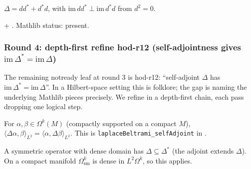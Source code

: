 \begin{lemma}[Pass hod.14: $\mathrm{im}\,\Delta = \mathrm{im}\,d\oplus\mathrm{im}\,d^{*}$]
\label{lem:hod-r14}
$\Delta = dd^{*} + d^{*}d$, with $\mathrm{im}\,dd^{*} \perp \mathrm{im}\,d^{*}d$ from $d^{2}=0$.
\leanok
\end{lemma}

\begin{lemma}
\label{lem:hod-r15}
 + .  Mathlib status: present.
\leanok\mathlibok
\end{lemma}

\subsubsection*{Round 4: depth-first refine hod-r12 (self-adjointness gives $\mathrm{im}\,\Delta^{*} = \mathrm{im}\,\Delta$)}

The remaining \textsf{notready} leaf at round 3 is hod-r12: ``self-adjoint $\Delta$ has $\mathrm{im}\,\Delta^{*} = \mathrm{im}\,\Delta$''.  In a Hilbert-space setting this is folklore; the gap is naming the underlying Mathlib pieces precisely.  We refine in a depth-first chain, each pass dropping one logical step.

\begin{lemma}
\label{lem:hod-r16}
For $\alpha,\beta\in\Omega^{k}(M)$ (compactly supported on a compact $M$),
$\langle\Delta\alpha,\beta\rangle_{L^{2}} = \langle\alpha,\Delta\beta\rangle_{L^{2}}$.
This is \texttt{laplaceBeltrami\_selfAdjoint} in .
\leanok
\end{lemma}

\begin{lemma}
\label{lem:hod-r17}
A symmetric operator with dense domain has $\Delta\subseteq\Delta^{*}$ (the adjoint extends $\Delta$).  On a compact manifold $\Omega^{k}_{\mathrm{sm}}$ is dense in $L^{2}\Omega^{k}$, so this applies.
\leanok
\end{lemma}

